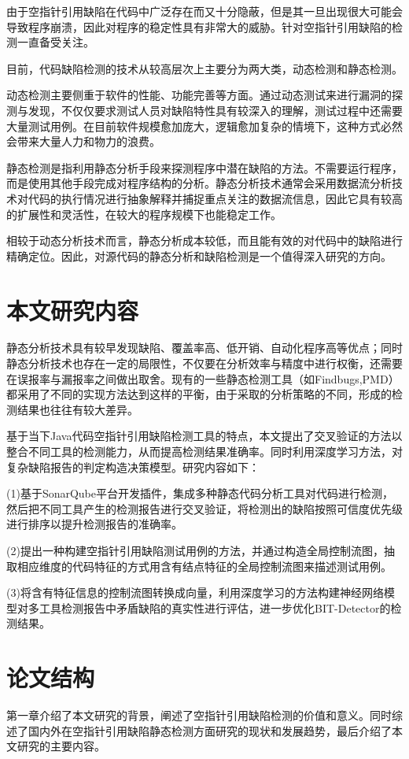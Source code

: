 由于空指针引用缺陷在代码中广泛存在而又十分隐蔽，但是其一旦出现很大可能会导致程序崩溃，因此对程序的稳定性具有非常大的威胁。针对空指针引用缺陷的检测一直备受关注。

目前，代码缺陷检测的技术从较高层次上主要分为两大类，动态检测\cite{wei2009safety}和静态检测\cite{lin2008static}。

动态检测主要侧重于软件的性能、功能完善等方面。通过动态测试来进行漏洞的探测与发现，不仅仅要求测试人员对缺陷特性具有较深入的理解，测试过程中还需要大量测试用例。在目前软件规模愈加庞大，逻辑愈加复杂的情境下，这种方式必然会带来大量人力和物力的浪费。

静态检测是指利用静态分析手段来探测程序中潜在缺陷的方法。不需要运行程序，而是使用其他手段完成对程序结构的分析。静态分析技术通常会采用数据流分析技术对代码的执行情况进行抽象解释并捕捉重点关注的数据流信息，因此它具有较高的扩展性和灵活性，在较大的程序规模下也能稳定工作。

相较于动态分析技术而言，静态分析成本较低，而且能有效的对代码中的缺陷进行精确定位。因此，对源代码的静态分析和缺陷检测是一个值得深入研究的方向。


\section{本文研究内容}
静态分析技术具有较早发现缺陷、覆盖率高、低开销、自动化程序高等优点；同时静态分析技术也存在一定的局限性，不仅要在分析效率与精度中进行权衡，还需要在误报率与漏报率之间做出取舍。现有的一些静态检测工具（如Findbugs,PMD）都采用了不同的实现方法达到这样的平衡，由于采取的分析策略的不同，形成的检测结果也往往有较大差异。

基于当下Java代码空指针引用缺陷检测工具的特点，本文提出了交叉验证的方法以整合不同工具的检测能力，从而提高检测结果准确率。同时利用深度学习方法，对复杂缺陷报告的判定构造决策模型。研究内容如下：

(1)基于SonarQube平台开发插件，集成多种静态代码分析工具对代码进行检测，然后把不同工具产生的检测报告进行交叉验证，将检测出的缺陷按照可信度优先级进行排序以提升检测报告的准确率。

(2)提出一种构建空指针引用缺陷测试用例的方法，并通过构造全局控制流图，抽取相应维度的代码特征的方式用含有结点特征的全局控制流图来描述测试用例。

(3)将含有特征信息的控制流图转换成向量，利用深度学习的方法构建神经网络模型对多工具检测报告中矛盾缺陷的真实性进行评估，进一步优化BIT-Detector的检测结果。

\section{论文结构}
第一章介绍了本文研究的背景，阐述了空指针引用缺陷检测的价值和意义。同时综述了国内外在空指针引用缺陷静态检测方面研究的现状和发展趋势，最后介绍了本文研究的主要内容。

